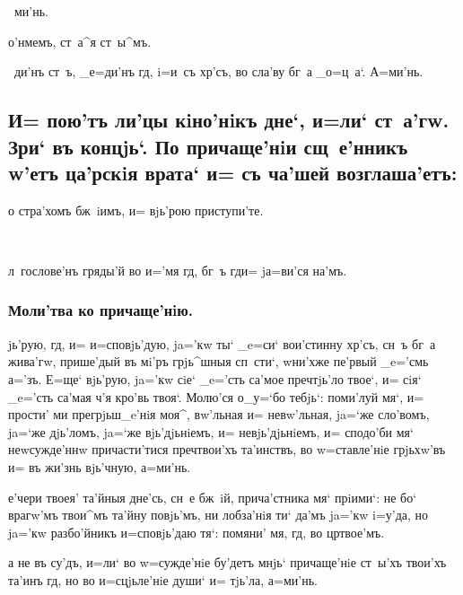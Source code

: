 \documentclass[12pt,twoside,a6paper,dvips,civil=antiqua,cs=izhitsa]{hipbook}
\newcommand{\lik}{\rem{Ли'къ:}\ }
\renewcommand{\*}{~~\raise3pt\hbox{\footnotesize*}}
\begin{document}
{{\lik{ми'нь.} 


о'нмемъ, ст~а^я ст~ы^мъ.

\lik{{\large{}ди'нъ ст~ъ, _е=ди'нъ гд, i=и~съ хр'съ, во сла'ву
    бг~а _о=ц~а`. А=ми'нь.}}

\subsection[Причаще'нiе мiря'нъ]{И= пою'тъ ли'цы кiно'нiкъ дне`, 
  и=ли` ст~а'гw. Зри` въ концjь`. По причаще'нiи сщ~е'нникъ w'етъ
  ца'рскiя врата` и= съ ча'шей возглаша'етъ:}

о стра'хомъ бж~iимъ, и= вjь'рою приступи'те.

\lik{{\large{}л~гослове'нъ гряды'й во и='мя гд, бг~ъ гд и=
    jа=ви'ся на'мъ.\par}}

\subsubsection{Моли'тва ко причаще'нiю.}

{\large{}jь'рую, гд, и= и=сповjь'дую, ja='кw ты` _e=си` вои'стинну
хр'съ, сн~ъ бг~а жива'гw, прише'дый въ мi'ръ грjь^шныя
сп~сти`, w\т ни'хже пе'рвый _e='смь а='зъ. Е=ще` вjь'рую, ja='кw
сiе` _e='сть са'мое преч тjь'ло твое`, и= сiя` _e='сть са'мая
ч'я кро'вь твоя`. Молю'ся о_у=`бо тебjь`: поми'луй мя`, и=
прости' ми прегрjьш_e'нiя моя^, вw'льная и= невw'льная, ja=`же
сло'вомъ, ja=`же дjь'ломъ, ja=`же вjь'дjьнiемъ, и=
невjь'дjьнiемъ, и= сподо'би мя` неwсужде'ннw
причасти'тися преч твои'хъ та'инствъ, во w=ставле'нiе
грjьхw'въ и= въ жи'знь вjь'чную, а=ми'нь.

е'чери твоея' та'йныя дне'сь, сн~е бж~iй, прича'стника мя`
прiими`: не бо` врагw'мъ твои^мъ та'йну повjь'мъ, ни лобза'нiя
ти` да'мъ ja='кw i=у'да, но ja='кw разбо'йникъ и=сповjь'даю
тя`: помяни' мя, гд, во цр твое'мъ.

а не въ су'дъ, и=ли` во w=сужде'нiе бу'детъ мнjь` причаще'нiе ст~ы'хъ
твои'хъ та'инъ гд, но во и=сцjьле'нiе души` и= тjь'ла, а=ми'нь.\par}


}}
\end{document}
